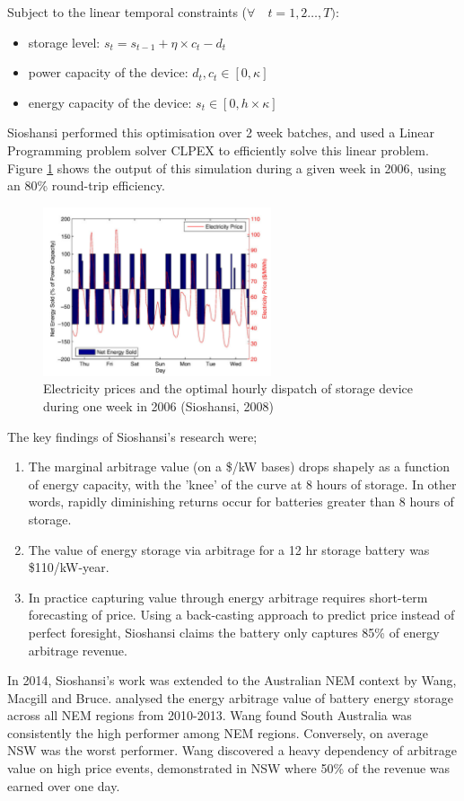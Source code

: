 Subject to the linear temporal constraints ($\forall \quad t = 1,2 \dots, T)$: 
\begin{itemize}
    \item storage level: $s_t = s_{t-1} + \eta \times c_t - d_t $
    \item power capacity of the device: $d_t, c_t \in [0, \kappa]$
    \item energy capacity of the device: $s_t \in [0, h \times \kappa]$
\end{itemize}
Sioshansi performed this optimisation over 2 week batches, and used a Linear Programming problem solver CLPEX to efficiently solve this linear problem. Figure \ref{fig:sioshansidispatch} shows the output of this simulation during a given week in 2006, using an 80\% round-trip efficiency.
\begin{figure}[H]
    \begin{center}
        \includegraphics[width=0.6\textwidth]{Pictures/Chapter2/Sioshansi_output.png}
    \end{center}
    
    \caption{Electricity prices and the optimal hourly dispatch of storage device during one
week in 2006 (Sioshansi, 2008) }
    \label{fig:sioshansidispatch}
\end{figure}
The key findings of Sioshansi's research were;
\begin{enumerate}
    \item The marginal arbitrage value (on a \$/kW bases) drops shapely as a function of energy capacity, with the 'knee' of the curve at 8 hours of storage. In other words, rapidly diminishing returns occur for batteries greater than 8 hours of storage. 
    \item The value of energy storage via arbitrage for a 12 hr storage battery was \$110/kW-year.
    \item In practice capturing value through energy arbitrage requires short-term forecasting of price. Using a back-casting approach to predict price instead of perfect foresight, Sioshansi claims the battery only captures 85\% of energy arbitrage revenue. 
\end{enumerate}
In 2014, Sioshansi's work was extended to the Australian NEM context by Wang, Macgill and Bruce. \citep{Wang} analysed the energy arbitrage value of battery energy storage across all NEM regions from 2010-2013. Wang found South Australia was consistently the high performer among NEM regions. Conversely, on average NSW was the worst performer. Wang discovered a heavy dependency of arbitrage value on high price events, demonstrated in NSW where 50\% of the revenue was earned over one day. 

